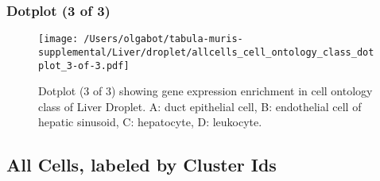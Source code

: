 \clearpage
\clearpage
\subsubsection{Dotplot (3 of 3)}
\begin{figure}[h]
\centering
\texttt{[image: /Users/olgabot/tabula-muris-supplemental/Liver/droplet/allcells\_cell\_ontology\_class\_dotplot\_3-of-3.pdf]}

\caption{ Dotplot (3 of 3)  showing gene expression enrichment in cell ontology class of Liver Droplet. A: duct epithelial cell, B: endothelial cell of hepatic sinusoid, C: hepatocyte, D: leukocyte.}
\end{figure}


\clearpage
\subsection{All Cells, labeled by Cluster Ids}
